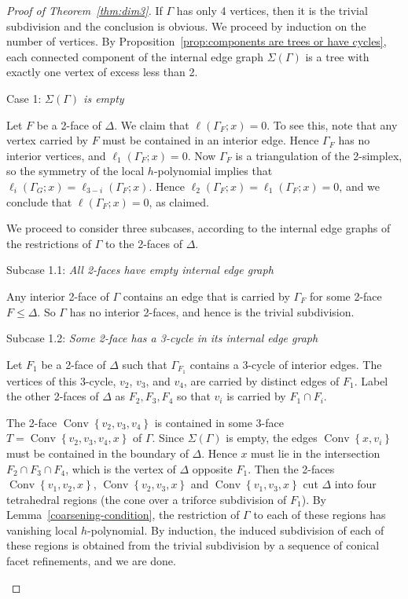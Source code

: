 \documentclass[ALCO,ThmDefs,Unicode,epreuves]{cedram}
\DeclareMathOperator{\Convop}{Conv}
\newcommand{\Conv}[1]{\Convop\left\{{#1}\right\}}
\newenvironment{proofsection}[2]{\begin{enonce*}[remark]{#1 \emph{#2}} \ }{\end{enonce*}}
\begin{document}
\begin{proof}[Proof of Theorem~\ref{thm:dim3}]
If $\Gamma$ has only 4 vertices, then it is the trivial subdivision and the conclusion is obvious. We proceed by induction on the number of vertices. By Proposition~\ref{prop:components are trees or have cycles}, each connected component of the internal edge graph $\Sigma(\Gamma)$ is a tree with exactly one vertex of excess less than 2. 

\begin{proofsection}{Case 1:}{$\Sigma(\Gamma)$ is empty}

Let $F$ be a 2-face of $\Delta$. We claim that $\ell(\Gamma_F;x) = 0$. To see this, note that any vertex carried by $F$ must be contained in an interior edge. Hence $\Gamma_F$ has no interior vertices, and $\ell_1(\Gamma_F;x) = 0$. Now $\Gamma_F$ is a triangulation of the 2-simplex, so the symmetry of the local $h$-polynomial implies that $\ell_i(\Gamma_G;x) = \ell_{3-i}(\Gamma_F;x)$. Hence $\ell_2(\Gamma_F;x) = \ell_1(\Gamma_F;x) = 0$, and we conclude that $\ell(\Gamma_F;x) = 0$, as claimed.


We proceed to consider three subcases, according to the internal edge graphs of the restrictions of $\Gamma$ to the 2-faces of $\Delta$.
\end{proofsection}

\begin{proofsection}{Subcase 1.1:}{All 2-faces have empty internal edge graph}

Any interior 2-face of $\Gamma$ contains an edge that is carried by $\Gamma_F$ for some 2-face $F \leq \Delta$. So $\Gamma$ has no interior 2-faces, and hence is the trivial subdivision. 
\end{proofsection}

\begin{proofsection}{Subcase 1.2:}{Some 2-face has a 3-cycle in its internal edge graph}

Let $F_1$ be a 2-face of $\Delta$ such that $\Gamma_{F_1}$ contains a 3-cycle of interior edges. 
The vertices of this 3-cycle, $v_2$, $v_3$, and 
$v_4$, are carried by distinct edges of $F_1$.
Label the other 2-faces of $\Delta$ as $F_2,F_3,F_4$ so that $v_i$ is carried by $F_1\cap F_i$. 

The 2-face $\Conv{v_2,v_3,v_4}$ is contained in some 3-face $T=\Conv{v_2,v_3,v_4,x}$ of $\Gamma$. Since $\Sigma(\Gamma)$
is empty, the edges $\Conv{x,v_i}$ must be contained in the boundary of $\Delta$. Hence $x$ must lie in the intersection $F_2\cap F_3\cap F_4$, which is the vertex of $\Delta$ opposite $F_1$. Then the 2-faces $\Conv{v_1,v_2,x}$, 
$\Conv{v_2,v_3,x}$ and $\Conv{v_1,v_3,x}$ cut $\Delta$ into four tetrahedral regions (the cone over a triforce subdivision of $F_1$). By Lemma~\ref{coarsening-condition}, the restriction of $\Gamma$ to each of these regions has vanishing local $h$-polynomial. By induction, the induced subdivision of each of these regions is obtained from the trivial subdivision by a sequence of conical facet refinements, and we are done.
\end{proofsection}


\end{proof}
\end{document}
